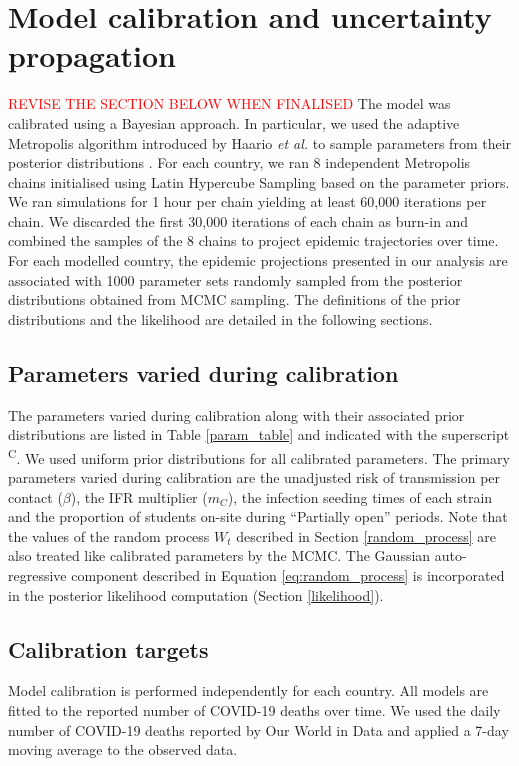 \section{Model calibration and uncertainty propagation}
\label{calibration}
\textcolor{red}{REVISE THE SECTION BELOW WHEN FINALISED}
The model was calibrated using a Bayesian approach. In particular, we used the adaptive 
Metropolis algorithm introduced by Haario \textit{et al.} to sample parameters from their 
posterior distributions \cite{haario-2001}. For each country, we ran 8 independent Metropolis 
chains initialised using Latin Hypercube Sampling based on the parameter priors. 
We ran simulations for 1 hour per chain yielding at least 60,000 iterations per 
chain. We discarded the first 30,000 iterations of each chain as burn-in and combined the 
samples of the 8 chains to project epidemic trajectories over time. 
For each modelled country, the epidemic projections presented in our analysis are associated with 1000 parameter sets 
randomly sampled from the posterior distributions obtained from MCMC sampling. 
The definitions of the prior distributions and the likelihood are detailed in the following sections.

\subsection{Parameters varied during calibration}

The parameters varied during calibration along with their associated prior distributions 
are listed in Table \ref{param_table} and indicated with the superscript \textsuperscript{C}.
We used uniform prior distributions for all calibrated parameters. The primary parameters varied during calibration are 
the unadjusted risk of transmission per contact ($\beta$), the IFR multiplier ($m_C$), the infection seeding times of 
each strain and the proportion of students on-site during ``Partially open'' periods. Note that the values of the random 
process $W_t$ described in Section \ref{random_process} are also treated like calibrated parameters by the MCMC. The Gaussian 
auto-regressive component described in Equation \ref{eq:random_process} is incorporated in the posterior likelihood 
computation (Section \ref{likelihood}).

\subsection{Calibration targets}
\label{targets}
Model calibration is performed independently for each country. All models are fitted to the reported number of COVID-19 deaths over time.
We used the daily number of COVID-19 deaths reported by Our World in Data and applied a 7-day moving average to the observed data. 

